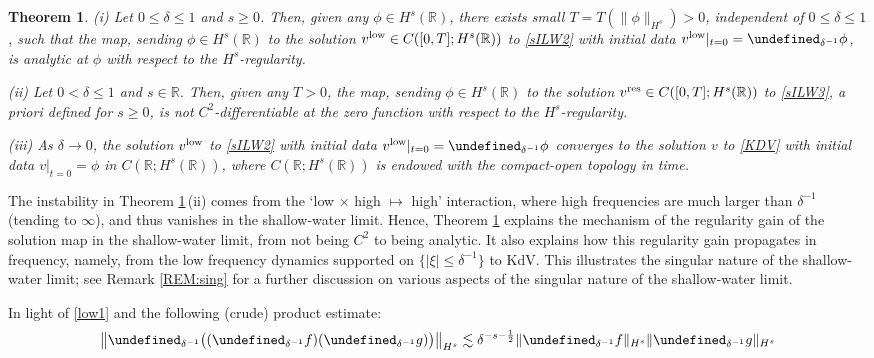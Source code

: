 \documentclass[letterpaper, 11pt,  reqno]{amsart}
\newtheorem{theorem}{Theorem} [section]
\newcommand{\1}{\hspace{0.5mm}\textup{I}\hspace{0.5mm}}
\newcommand{\noi}{\noindent}
\newcommand{\R}{\mathbb{R}}
\let\P= \undefined
\newcommand{\P}{\mathbf{P}}
\newcommand{\low}{\textup{low}}
\newcommand{\high}{\textup{res}}
\newcommand{\dl}{\delta}
\newcommand{\les}{\lesssim}
\numberwithin{equation}{section}
\numberwithin{theorem}{section}
\begin{document}
\begin{theorem}\label{THM:1}
\textup{(i)}
Let $0 \le \dl \le 1$ and  $s \ge 0$.  Then, given 
any $\phi \in H^s(\R)$, 
there exists small $T = T(\|\phi\|_{H^s})> 0$, 
independent of $0 \le \dl \le 1$, 
such that 
the  map, sending $\phi \in H^s(\R)$
to the solution $v^\low  \in C([0, T]; H^s(\R))$
to \eqref{sILW2}
with initial data  $v^\low|_{t = 0} =\P_{ \dl^{-1}} \phi$, 
is analytic at $\phi$ with respect to the $H^s$-regularity.





\medskip

\noi
\textup{(ii)}
Let $0 < \dl \le 1$ and $s \in \R$.  Then, given any $T > 0$, 
the  map, sending $\phi \in H^s(\R)$
to the solution $v^\high  \in C([0, T]; H^s(\R))$
to \eqref{sILW3}, a priori defined for $s \ge 0$, 
is not $C^2$-differentiable at the zero function with respect to the $H^s$-regularity.


\medskip

\noi
\textup{(iii)}
As $\dl \to 0$, 
the solution $v^\low$ to \eqref{sILW2}
with initial data  $v^\low|_{t = 0} =  \P_{ \dl^{-1}} \phi$
converges to 
the solution $v$ to \eqref{KDV}
with initial data  $v|_{t = 0} =  \phi$
in $C(\R; H^s(\R))$, 
where
$C(\R; H^s(\R))$ is endowed with the compact-open topology in time.



\end{theorem}
	
	
The instability in 
Theorem \ref{THM:1}\,(ii)
comes from 
the `low $\times$ high $\mapsto$ high' interaction, 
where high frequencies are much larger than $\dl^{-1}$
(tending to $\infty$), and thus  vanishes in the shallow-water limit.
Hence, Theorem \ref{THM:1}
explains the mechanism of 
 the regularity gain of the solution map in the shallow-water limit, 
from  not being $C^2$ to being analytic.
It also explains how this regularity gain 
propagates in frequency,
namely, from the low frequency dynamics 
supported on $\{|\xi|\le \dl^{-1}\}$ 
to KdV.
This illustrates the singular nature
of the 
 shallow-water limit;
 see Remark \ref{REM:sing}
 for a further discussion
 on various aspects of the singular nature
 of the shallow-water limit.

	










In light of \eqref{low1}
and the following (crude) product estimate:
\[ \big\|\P_{\dl^{-1}}\big((\P_{\dl^{-1}}f)(\P_{\dl^{-1}} g) \big)    \big\|_{H^s}
\les \dl^{-s - \frac 12 }\| \P_{\dl^{-1}}f \|_{H^s}
\| \P_{\dl^{-1}}g \|_{H^s}
\]
\end{document}
